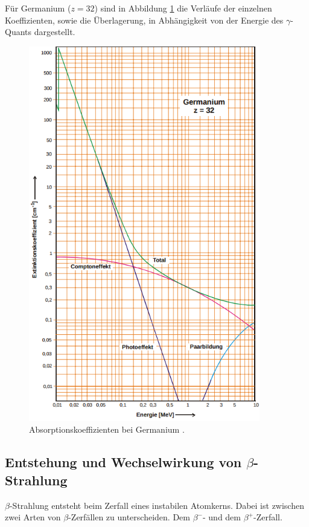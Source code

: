\documentclass[
  bibliography=totoc,     %
  captions=tableheading,  %
  titlepage=firstiscover, %
]{scrartcl}
\begin{document}
\noindent
Für Germanium ($z = 32$) sind in Abbildung \ref{fig:V7041} die Verläufe der einzelnen
Koeffizienten, sowie die Überlagerung, in Abhängigkeit von der Energie des
$\gamma$-Quants dargestellt.
\begin{figure}[htb]
  \centering
  \includegraphics[width=0.9\textwidth]{V7041.png}
  \caption{Absorptionskoeffizienten bei Germanium \cite{anleitung}.}
  \label{fig:V7041}
\end{figure}

\subsection{Entstehung und Wechselwirkung von \texorpdfstring{$\beta$}{beta}-Strahlung}
$\beta$-Strahlung entsteht beim Zerfall eines instabilen Atomkerns.
Dabei ist zwischen zwei Arten von $\beta$-Zerfällen zu unterscheiden.
Dem $\beta^-$- und dem $\beta^+$-Zerfall.
\end{document}
